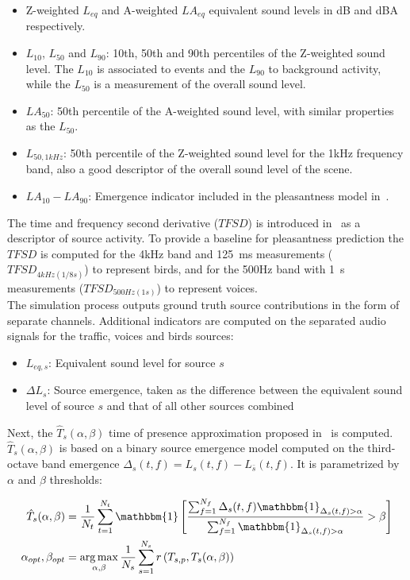 \documentclass[11pt,a4paper]{article}
\DeclareMathOperator*{\argmax}{arg\,max}
\begin{document}
\begin{itemize}
\item Z-weighted $L_{eq}$ and A-weighted $LA_{eq}$ equivalent sound levels in dB and dBA respectively.
\item $L_{10}$, $L_{50}$ and $L_{90}$: 10th, 50th and 90th percentiles of the Z-weighted sound level. The $L_{10}$ is associated to events and the $L_{90}$ to background activity, while the $L_{50}$ is a measurement of the overall sound level.
\item $LA_{50}$: 50th percentile of the A-weighted sound level, with similar properties as the $L_{50}$.
\item $L_{50, 1kHz}$: 50th percentile of the Z-weighted sound level for the 1kHz frequency band, also a good descriptor of the overall sound level of the scene.
\item $LA_{10}-LA_{90}$: Emergence indicator included in the pleasantness model in~\cite{ricciardi2014}.
\end{itemize}

The time and frequency second derivative ($TFSD$) is introduced in~\cite{aumond2017} as a descriptor of source activity. To provide a baseline for pleasantness prediction the $TFSD$ is computed for the 4kHz band and 125~ms measurements ($TFSD_{4kHz(1/8s)}$) to represent birds, and for the 500Hz band with 1~s measurements ($TFSD_{500Hz(1s)}$) to represent voices.\\

The simulation process outputs ground truth source contributions in the form of separate channels. Additional indicators are computed on the separated audio signals for the traffic, voices and birds sources:

\begin{itemize}
\item $L_{eq, s}$: Equivalent sound level for source $s$
\item $\Delta L_{s}$: Source emergence, taken as the difference between the equivalent sound level of source $s$ and that of all other sources combined
\end{itemize}

Next, the $\hat T_s(\alpha, \beta)$ time of presence approximation proposed in~\cite{gontier2018} is computed. $\hat T_s(\alpha, \beta)$ is based on a binary source emergence model computed on the third-octave band emergence $\Delta_s(t, f) = L_s(t, f) - L_{\bar{s}}(t, f)$. It is parametrized by $\alpha$ and $\beta$ thresholds:

\begin{align}
\hat T_s(\alpha, \beta) &= \frac{1}{N_t}\sum_{t = 1}^{N_t}\mathbbm{1}\left[ \frac{\sum_{f = 1}^{N_f}\Delta_s(t, f)\mathbbm{1}_{\Delta_s(t, f)>\alpha}}{\sum_{f = 1}^{N_f}\mathbbm{1}_{\Delta_s(t, f)>\alpha}}>\beta \right]\\
\alpha_{opt},\beta_{opt} &= \argmax_{\alpha, \beta}\frac{1}{N_s}\sum_{s = 1}^{N_s}r\left(T_{s, p}, T_s(\alpha, \beta)\right)
\end{align}
\end{document}
